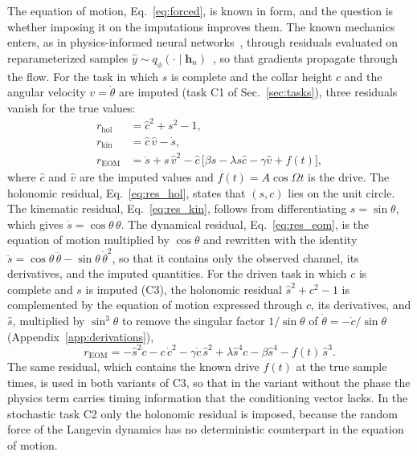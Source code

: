 The equation of motion, Eq.~\eqref{eq:forced}, is known in form, and the question is whether imposing it on the imputations improves them. The known mechanics enters, as in physics-informed neural networks~\cite{Raissi2019}, through residuals evaluated on reparameterized samples $\hat y\sim q_\phi(\cdot\mid\mathbf h_n)$~\cite{Kingma2014}, so that gradients propagate through the flow. For the task in which $s$ is complete and the collar height $c$ and the angular velocity $v=\dot\theta$ are imputed (task C1 of Sec.~\ref{sec:tasks}), three residuals vanish for the true values:
\begin{align}
r_{\mathrm{hol}} &= \hat c^{2}+s^{2}-1, \label{eq:res_hol}\\
r_{\mathrm{kin}} &= \hat c\,\hat v - \dot s, \label{eq:res_kin}\\
r_{\mathrm{EOM}} &= \ddot s + s\,\hat v^{2} - \hat c\,\bigl[\beta s - \lambda s\hat c - \gamma\hat v + f(t)\bigr], \label{eq:res_eom}
\end{align}
where $\hat c$ and $\hat v$ are the imputed values and $f(t)=A\cos\Omega t$ is the drive. The holonomic residual, Eq.~\eqref{eq:res_hol}, states that $(s,c)$ lies on the unit circle. The kinematic residual, Eq.~\eqref{eq:res_kin}, follows from differentiating $s=\sin\theta$, which gives $\dot s=\cos\theta\,\dot\theta$. The dynamical residual, Eq.~\eqref{eq:res_eom}, is the equation of motion multiplied by $\cos\theta$ and rewritten with the identity $\ddot s=\cos\theta\,\ddot\theta-\sin\theta\,\dot\theta^{2}$, so that it contains only the observed channel, its derivatives, and the imputed quantities. For the driven task in which $c$ is complete and $s$ is imputed (C3), the holonomic residual $\hat s^{2}+c^{2}-1$ is complemented by the equation of motion expressed through $c$, its derivatives, and $\hat s$, multiplied by $\sin^{3}\theta$ to remove the singular factor $1/\sin\theta$ of $\dot\theta=-\dot c/\sin\theta$ (Appendix~\ref{app:derivations}),
\begin{equation}
r_{\mathrm{EOM}} = -\hat s^{2}\ddot c - c\,\dot c^{2} - \gamma\dot c\,\hat s^{2} + \lambda\hat s^{4}c - \beta\hat s^{4} - f(t)\,\hat s^{3}.
\label{eq:res_c3}
\end{equation}
The same residual, which contains the known drive $f(t)$ at the true sample times, is used in both variants of C3, so that in the variant without the phase the physics term carries timing information that the conditioning vector lacks. In the stochastic task C2 only the holonomic residual is imposed, because the random force of the Langevin dynamics has no deterministic counterpart in the equation of motion.

